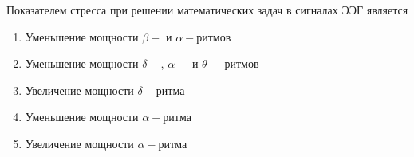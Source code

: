 
Показателем стресса при решении математических задач в сигналах ЭЭГ является

\begin{enumerate}
    \item Уменьшение мощности $\beta-$ и $\alpha-$ритмов
    \item Уменьшение мощности $\delta-$, $\alpha-$ и $\theta-$ ритмов
    \item Увеличение мощности $\delta-$ритма
    \item Уменьшение мощности $\alpha-$ритма
    \item Увеличение мощности $\alpha-$ритма
\end{enumerate}